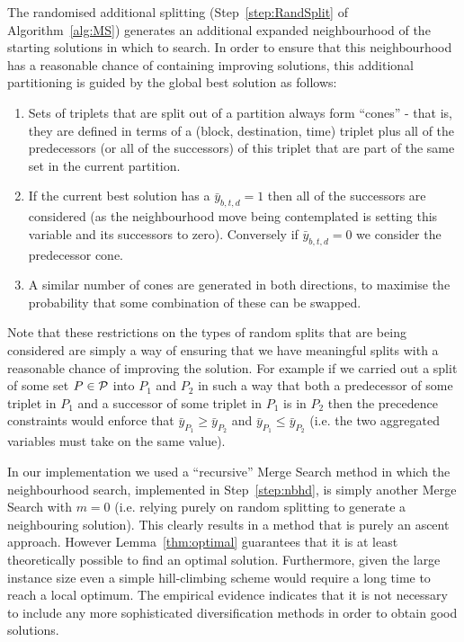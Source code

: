 \documentclass[authoryear,11pt,square,number,times,super,comma]{elsarticle}
\begin{document}
The randomised additional splitting (Step~\ref{step:RandSplit} of
Algorithm~\ref{alg:MS}) generates an additional expanded neighbourhood of the starting solutions in which to search. In order to ensure that this 
neighbourhood has a reasonable chance of containing improving solutions, this additional partitioning is guided by the global best solution as follows:
\begin{enumerate}
\item Sets of triplets that are split out of a partition always form ``cones'' - that is, they are defined in terms of a (block, destination, time) triplet 
plus all of the predecessors (or all of the successors) of this triplet that are part of the same set in the current partition.
\item If the current best solution has a $\bar y_{b,t,d}=1$ then all of the successors are considered (as the neighbourhood move being contemplated is setting 
this variable and its successors to zero). Conversely if $\bar y_{b,t,d}=0$ we consider the predecessor cone.
\item A similar number of cones are generated in both directions, to maximise the probability that some combination of these can be swapped.
\end{enumerate}
Note that these restrictions on the types of random splits that are being considered are simply a way of ensuring that we have meaningful splits with a reasonable chance of improving the solution. For example if we carried out a split of some set $P\in\cal P$ into $P_1$ and $P_2$ in such a way that both a predecessor of some triplet in $P_1$ and a successor of some triplet in $P_1$ is in $P_2$ then the precedence constraints would enforce that $\bar y_{P_1}\ge \bar y_{P_2}$ and $\bar y_{P_1} \le \bar y_{P_2}$ (i.e. the two aggregated variables must take on the same value).  

In our implementation we used a
``recursive'' Merge Search method in which the neighbourhood search,
implemented in Step~\ref{step:nbhd}, is simply another Merge Search with
$m=0$ (i.e. relying purely on random splitting to generate a neighbouring
solution). This clearly results in a method that is purely an ascent approach.
However Lemma~\ref{thm:optimal} guarantees that it is at least theoretically possible to find an optimal solution. 
Furthermore, given the large instance size even a simple hill-climbing scheme would require a long time to reach a local optimum. The empirical evidence indicates that
it is not necessary to include any more sophisticated diversification methods in order to obtain good solutions. 
\end{document}

